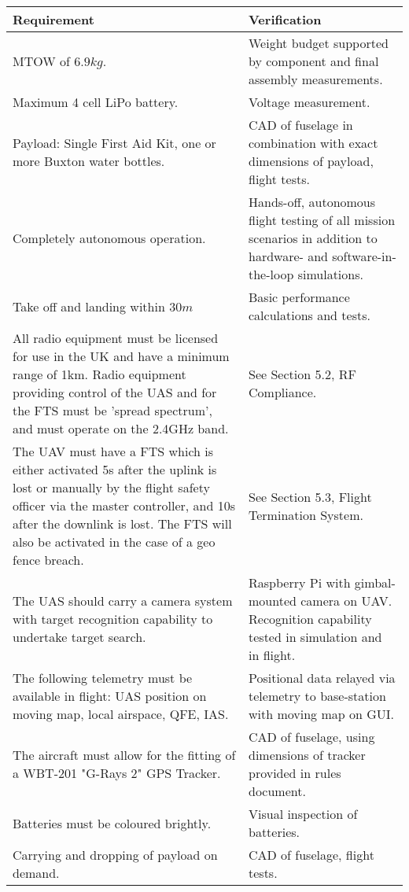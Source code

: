 \begin{longtable}{@{\makebox[0.08\textwidth][l]{\rownumber}} | p{} | p{}}
	\textbf{Requirement} & \textbf{Verification} 
	\gdef\rownumber{Req.\space\stepcounter{magicrownumbers}\arabic{magicrownumbers}} \\ \hline
	MTOW of $6.9kg$. & Weight budget supported by component and final assembly measurements.\\ \hline
	Maximum 4 cell LiPo battery. & Voltage measurement. \\ \hline
	Payload: Single First Aid Kit, one or more Buxton water bottles. & CAD of fuselage in combination with exact dimensions of payload, flight tests. \\ \hline
	Completely autonomous operation. & Hands-off, autonomous flight testing of all mission scenarios in addition to hardware- and software-in-the-loop simulations. \\ \hline
	Take off and landing within $30\si{m}$ & Basic performance calculations and tests. \\ \hline
	All radio equipment must be licensed for use in the UK and have a minimum range of 1km. Radio equipment providing control of the UAS and for the FTS must be 'spread spectrum', and must operate on the 2.4GHz band. & See Section 5.2, RF Compliance. \\ \hline
	The UAV must have a FTS which is either activated 5s after the uplink is lost or manually by the flight safety officer via the master controller, and 10s after the downlink is lost. The FTS will also be activated in the case of a geo fence breach. & See Section 5.3, Flight Termination System. \\ \hline
	The UAS should carry a camera system with target recognition capability to undertake target search. & Raspberry Pi with gimbal-mounted camera on UAV. Recognition capability tested in simulation and in flight. \\ \hline
	The following telemetry must be available in flight: UAS position on moving map, local airspace, QFE, IAS. & Positional data relayed via telemetry to base-station with moving map on GUI. \\ \hline
	The aircraft must allow for the fitting of a WBT-201 "G-Rays 2" GPS Tracker. & CAD of fuselage, using dimensions of tracker provided in rules document. \\ \hline
	Batteries must be coloured brightly. & Visual inspection of batteries. \\ \hline
	Carrying and dropping of payload on demand. & CAD of fuselage, flight tests.\\ \hline

\end{longtable}
